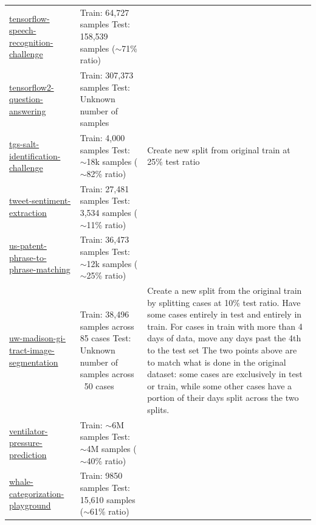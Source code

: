 \documentclass{article} %
\begin{document}
\begin{longtable}{m{4cm} m{4.5cm} m{4cm}}
    \href{https://www.kaggle.com/c/tensorflow-speech-recognition-challenge}{tensorflow-speech-recognition-challenge} &  Train: 64,727 samples \newline  Test: 158,539 samples ($\sim$71\% ratio) & \\
    \href{https://www.kaggle.com/c/tensorflow2-question-answering}{tensorflow2-question-answering} &  Train: 307,373 samples \newline  Test: Unknown number of samples & \\
    \href{https://www.kaggle.com/c/tgs-salt-identification-challenge}{tgs-salt-identification-challenge} &  Train: 4,000 samples \newline  Test: $\sim$18k samples ($\sim$82\% ratio) & Create new split from original train at 25\% test ratio\\
    \href{https://www.kaggle.com/c/tweet-sentiment-extraction}{tweet-sentiment-extraction} &  Train: 27,481 samples \newline  Test: 3,534 samples ($\sim$11\% ratio) & \\
    \href{https://www.kaggle.com/c/us-patent-phrase-to-phrase-matching}{us-patent-phrase-to-phrase-matching} &  Train: 36,473 samples \newline  Test: $\sim$12k samples ($\sim$25\% ratio) & \\
    \href{https://www.kaggle.com/c/uw-madison-gi-tract-image-segmentation}{uw-madison-gi-tract-image-segmentation} &  Train: 38,496 samples across 85 cases \newline  Test: Unknown number of samples across ~50 cases & Create a new split from the original train by splitting cases at 10\% test ratio. \newline Have some cases entirely in test and entirely in train. \newline For cases in train with more than 4 days of data, move any days past the 4th to the test set \newline The two points above are to match what is done in the original dataset: some cases are exclusively in test or train, while some other cases have a portion of their days split across the two splits. \\
    \href{https://www.kaggle.com/c/ventilator-pressure-prediction}{ventilator-pressure-prediction} &  Train: $\sim$6M samples \newline  Test: $\sim$4M samples ($\sim$40\% ratio) & \\
    \href{https://www.kaggle.com/c/whale-categorization-playground}{whale-categorization-playground} &  Train: 9850 samples \newline  Test: 15,610 samples ($\sim$61\% ratio) & \\

\end{longtable}
\end{document}
